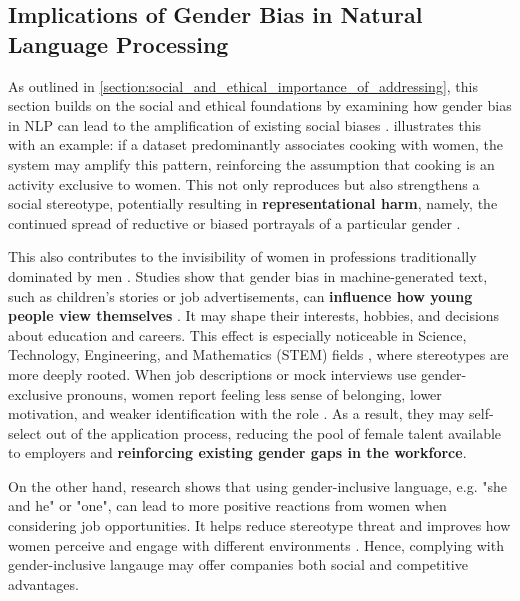 \subsection{Implications of Gender Bias in Natural Language Processing} \label{subsection:implications_of_gb_in_nlp}
As outlined in \autoref{section:social_and_ethical_importance_of_addressing}, this section builds on the social and ethical foundations by examining how gender bias in NLP can lead to the amplification of existing social biases \citep{rescignoGenderBiasMachine2023}.
\citet{ullmannGenderBiasMachine2022} illustrates this with an example: if a dataset predominantly associates cooking with women, the system may amplify this pattern, reinforcing the assumption that cooking is an activity exclusive to women. This not only reproduces but also strengthens a social stereotype, potentially resulting in \textbf{representational harm}, namely, the continued spread of reductive or biased portrayals of a particular gender \citep{stanczakSurveyGenderBias2021}. 

This also contributes to the invisibility of women in professions traditionally dominated by men \citep{kapplAreAllSpanish2025}. Studies show that gender bias in machine-generated text, such as children's stories or job advertisements, can \textbf{influence how young people view themselves} \citep{soundararajanInvestigatingGenderBias2024,kapplAreAllSpanish2025}. It may shape their interests, hobbies, and decisions about education and careers. This effect is especially noticeable in Science, Technology, Engineering, and Mathematics (STEM) fields \citep{pratesAssessingGenderBias2019}, where stereotypes are more deeply rooted. When job descriptions or mock interviews use gender-exclusive pronouns, women report feeling less sense of belonging, lower motivation, and weaker identification with the role \citep{godsilEffectsGenderRoles2016}. As a result, they may self-select out of the application process, reducing the pool of female talent available to employers and \textbf{reinforcing existing gender gaps in the workforce}.

On the other hand, research shows that using gender-inclusive language, e.g. "she and he" or "one", can lead to more positive reactions from women when considering job opportunities. It helps reduce stereotype threat and improves how women perceive and engage with different environments \citep{ godsilEffectsGenderRoles2016}. Hence, complying with gender-inclusive langauge may offer companies both social and competitive advantages.


